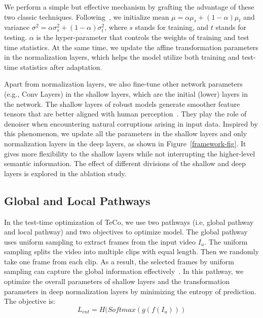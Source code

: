 \documentclass{article} %
\begin{document}
We perform a simple but effective mechanism by grafting the advantage of these two classic techniques.
Following~\citep{schneider2020improving}, we initialize mean $\mu = \alpha \mu_{s} + (1-\alpha) \mu_{t}$ and variance $ \sigma^2 =\alpha \sigma_{s}^2 + (1-\alpha) \sigma_{t}^2$, where $s$ stands for training, and $t$ stands for testing. $\alpha$ is the hyper-parameter that controls the weights of training and test time statistics.
At the same time, we update the affine transformation parameters in the normalization layers, which helps the model utilize both training and test-time statistics after adaptation.

Apart from normalization layers, we also fine-tune other network parameters (e.g., Conv Layers) in the shallow layers, which are the initial (lower) layers in the network. The shallow layers of robust models generate smoother feature tensors that are better aligned with human perception~\citep{xie2019feature,tsipras2018robustness}. They play the role of denoiser when encountering natural corruptions arising in input data. 
Inspired by this phenomenon, we update all the parameters in the shallow layers and only normalization layers in the deep layers, as shown in Figure~\ref{framework-fig}. 
It gives more flexibility to the shallow layers while not interrupting the higher-level semantic information.  
The effect of different divisions of the shallow and deep layers is explored in the ablation study.

\subsection{Global and Local Pathways}
In the test-time optimization of TeCo, we use two pathways (i.e, global pathway and local pathway) and two objectives to optimize model. 
The global pathway uses uniform sampling to extract frames from the input video $I_{u}$. 
The uniform sampling splits the video into multiple clips with equal length. Then we randomly take one frame from each clip. 
As a result, the selected frames by uniform sampling can capture the global information effectively~\citep{chen2020deep}. 
In this pathway, we optimize the overall parameters of shallow layers and the transformation parameters in deep normalization layers by minimizing the entropy of prediction. 
The objective is:
\begin{equation}
\label{ent-equ}
    L_{ent}=H(Softmax(g(f(I_{u})))
\end{equation}
\end{document}
